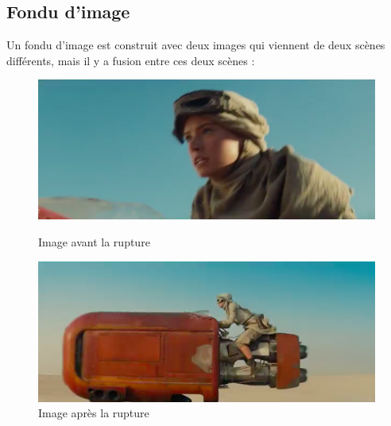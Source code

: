 \subsection{Fondu d'image}
Un fondu d’image est construit avec deux images qui viennent de deux scènes différents, mais il y a fusion entre ces deux scènes :

\begin{figure}[h!]
   \begin{minipage}[c]{.46\linewidth}
	  \centering
      \includegraphics[scale=0.3]{images/rupture2-1.png}
      \caption{\label{Avant} Image avant la rupture}
   \end{minipage} \hfill
   \begin{minipage}[c]{.46\linewidth}
      \centering
      \includegraphics[scale=0.3]{images/rupture2-2.png}
      \caption{\label{Après} Image après la rupture}
   \end{minipage}
\end{figure}